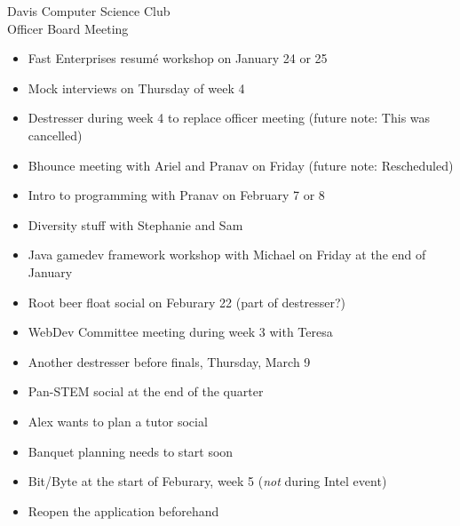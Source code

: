 \documentclass{article}
\begin{document}
\begin{Minutes}{Davis Computer Science Club\\Officer Board Meeting}
\begin{itemize}
\item Fast Enterprises resum\'e workshop on January 24 or 25
\item Mock interviews on Thursday of week 4
\item Destresser during week 4 to replace officer meeting (future note: This was cancelled)
\item Bhounce meeting with Ariel and Pranav on Friday (future note: Rescheduled)
\item Intro to programming with Pranav on February 7 or 8
\item Diversity stuff with Stephanie and Sam
\item Java gamedev framework workshop with Michael on Friday at the end of January
\item Root beer float social on Feburary 22 (part of destresser?)
\item WebDev Committee meeting during week 3 with Teresa
\item Another destresser before finals, Thursday, March 9
\item Pan-STEM social at the end of the quarter
\item Alex wants to plan a tutor social
\item Banquet planning needs to start soon
\end{itemize}
\begin{itemize}
\item Bit/Byte at the start of Feburary, week 5 (\textit{not} during Intel event)
\item Reopen the application beforehand
\end{itemize}
\thispagestyle{creditfooter}
\end{Minutes}
\end{document}
